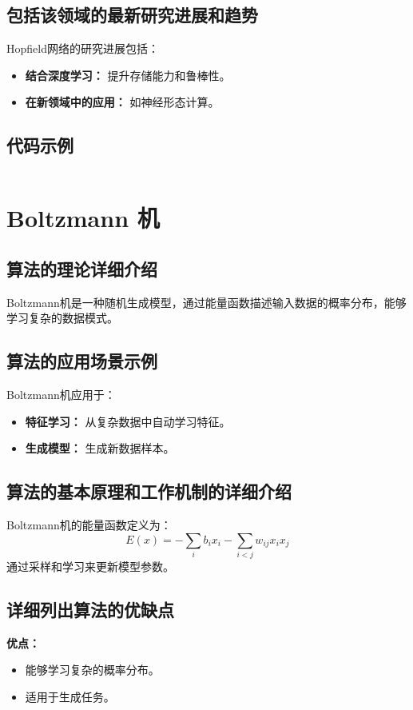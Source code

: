 \subsection*{包括该领域的最新研究进展和趋势}
Hopfield网络的研究进展包括：
\begin{itemize}
    \item \textbf{结合深度学习：} 提升存储能力和鲁棒性。
    \item \textbf{在新领域中的应用：} 如神经形态计算。
\end{itemize}
\subsection*{代码示例}
\begin{lstlisting}

\end{lstlisting}


\section{Boltzmann 机}
\subsection*{算法的理论详细介绍}
Boltzmann机是一种随机生成模型，通过能量函数描述输入数据的概率分布，能够学习复杂的数据模式。

\subsection*{算法的应用场景示例}
Boltzmann机应用于：
\begin{itemize}
    \item \textbf{特征学习：} 从复杂数据中自动学习特征。
    \item \textbf{生成模型：} 生成新数据样本。
\end{itemize}

\subsection*{算法的基本原理和工作机制的详细介绍}
Boltzmann机的能量函数定义为：
\[
    E(x) = -\sum_{i} b_i x_i - \sum_{i<j} w_{ij} x_i x_j
\]
通过采样和学习来更新模型参数。

\subsection*{详细列出算法的优缺点}
\textbf{优点：}
\begin{itemize}
    \item 能够学习复杂的概率分布。
    \item 适用于生成任务。
\end{itemize}

